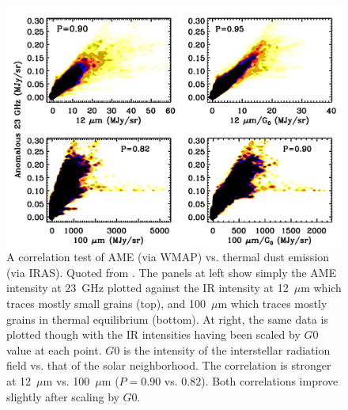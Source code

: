 \begin{figure}[htbp]
\begin{center}
\includegraphics[width=150mm]{EPS/correl_ciel.pdf}
\caption{
A correlation test of AME (via WMAP) vs. thermal dust emission (via IRAS). Quoted from \cite{ysard10b}. The panels at left show simply the AME intensity at 23~GHz plotted against the IR intensity at 12~$\mu$m which traces mostly small grains (top), and 100~$\mu$m which traces mostly grains in thermal equilibrium (bottom). At right, the same data is plotted though with the IR intensities having been scaled by $G0$ value at each point. $G0$ is the intensity of the interstellar radiation field vs. that of the solar neighborhood. The correlation is stronger at 12~$\mu$m vs. 100~$\mu$m ($P=0.90$ vs. $0.82$). Both correlations improve slightly after scaling by $G0$.
 }
\label{ysardcorrel}
\end{center}
\end{figure}


